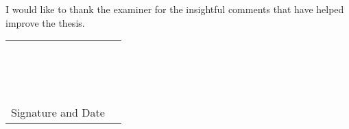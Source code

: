 \documentclass{article}
\begin{document}
I would like to thank the examiner for the insightful comments that have helped improve the thesis.


\begin{table}[h]
	\begin{tabular}{ll}
	 	& \\
		& \\
		& \\ 
		& \\
		& \\
		& \\
		& \\
		& \\
		& \\
		& \\
		& \\
		& \\
		& \\
		& \\
		& \\
		 
		Signature and Date 
	\end{tabular}
\end{table}
\end{document}
